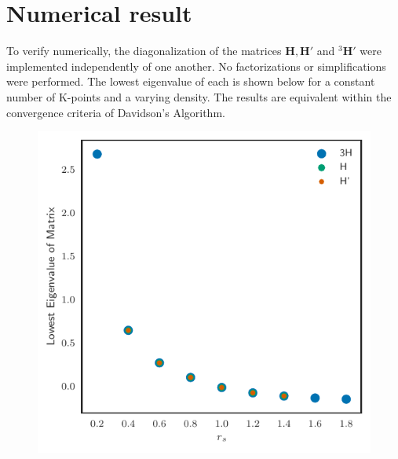 \documentclass{revtex4}
\begin{document}
\section{Numerical result}
To verify numerically, the diagonalization of the matrices $\mathbf{H}, \mathbf{H}'$ and 
${}^3\mathbf{H}'$ were implemented independently of one another. No factorizations or 
simplifications were performed. The lowest eigenvalue of each is shown below for a constant number
of K-points and a varying density. The results are equivalent within the convergence criteria of 
Davidson's Algorithm.  
\begin{figure}[h]
  \includegraphics[width=0.75\linewidth]{../../images/Matrix_Compare.pdf}
\end{figure}
\end{document}
